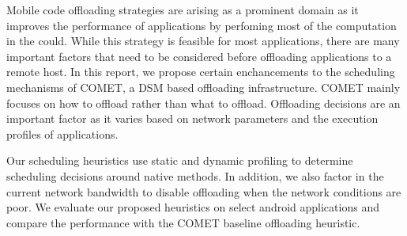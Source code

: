 \vspace{2mm}
Mobile code offloading strategies are arising as a prominent domain as it improves the performance of
applications by perfoming most of the computation in the could. While this strategy is feasible for most
applications, there are many important factors that need to be considered before offloading applications
to a remote host. In this report, we propose certain enchancements to the scheduling mechanisms of COMET,
a DSM based offloading infrastructure. COMET mainly focuses on how to offload rather than what to offload.
Offloading decisions are an important factor as it varies based on network parameters and the execution
profiles of applications.

Our scheduling heuristics use static and dynamic profiling to determine scheduling decisions around native
methods. In addition, we also factor in the current network bandwidth to disable offloading when the network
conditions are poor. We evaluate our proposed heuristics on select android applications and compare the
performance with the COMET baseline offloading heuristic.
